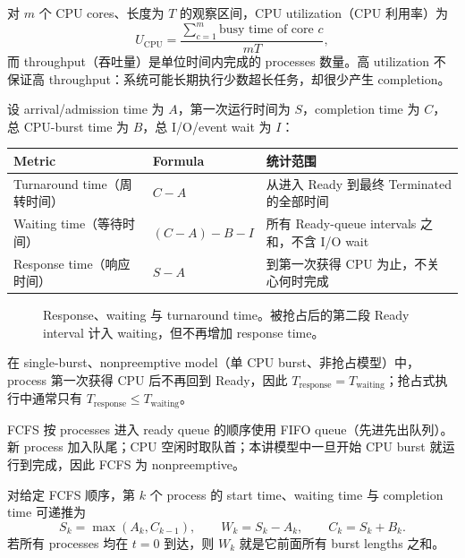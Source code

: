 对 $m$ 个 CPU cores、长度为 $T$ 的观察区间，CPU utilization（CPU 利用率）为
\[
  U_{\mathrm{CPU}}
  =\frac{\sum_{c=1}^{m}\text{busy time of core }c}{mT},
\]
而 throughput（吞吐量）是单位时间内完成的 processes 数量。高 utilization 不保证高 throughput：系统可能长期执行少数超长任务，却很少产生 completion。

设 arrival/admission time 为 $A$，第一次运行时间为 $S$，completion time 为 $C$，总 CPU-burst time 为 $B$，总 I/O/event wait 为 $I$：
\begin{center}
\small
\begin{tabularx}{0.96\textwidth}{@{}>{\raggedright\arraybackslash}p{3.1cm}>{\centering\arraybackslash}p{3.3cm}X@{}}
  \toprule
  Metric & Formula & 统计范围 \\
  \midrule
  Turnaround time（周转时间） & $C-A$ & 从进入 Ready 到最终 Terminated 的全部时间 \\
  Waiting time（等待时间） & $(C-A)-B-I$ & 所有 Ready-queue intervals 之和，不含 I/O wait \\
  Response time（响应时间） & $S-A$ & 到第一次获得 CPU 为止，不关心何时完成 \\
  \bottomrule
\end{tabularx}
\end{center}

\begin{figure}[htbp]
  \centering
  \resizebox{0.92\textwidth}{!}{}
  \caption{Response、waiting 与 turnaround time。被抢占后的第二段 Ready interval 计入 waiting，但不再增加 response time。}
  \label{fig:sc2005-l05-scheduling-metrics}
\end{figure}

在 single-burst、nonpreemptive model（单 CPU burst、非抢占模型）中，process 第一次获得 CPU 后不再回到 Ready，因此 $T_{\mathrm{response}}=T_{\mathrm{waiting}}$；抢占式执行中通常只有 $T_{\mathrm{response}}\le T_{\mathrm{waiting}}$。


FCFS 按 processes 进入 ready queue 的顺序使用 FIFO queue（先进先出队列）。新 process 加入队尾；CPU 空闲时取队首；本讲模型中一旦开始 CPU burst 就运行到完成，因此 FCFS 为 nonpreemptive。

对给定 FCFS 顺序，第 $k$ 个 process 的 start time、waiting time 与 completion time 可递推为
\[
  S_k=\max(A_k,C_{k-1}),\qquad
  W_k=S_k-A_k,\qquad
  C_k=S_k+B_k.
\]
若所有 processes 均在 $t=0$ 到达，则 $W_k$ 就是它前面所有 burst lengths 之和。

